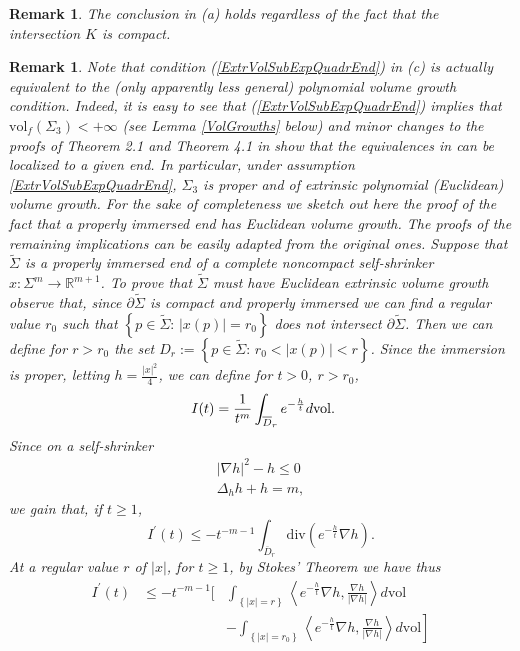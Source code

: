 \documentclass[11pt,leqno]{amsart}\usepackage{amsmath}
\newtheorem{remark}[theorem]{Remark}
\numberwithin{equation}{section}
\begin{document}
\begin{remark}
\rm{The conclusion in (a) holds regardless of the fact that the intersection $K$ is compact.}
\end{remark}
\begin{remark}
\rm{Note that condition (\ref{ExtrVolSubExpQuadrEnd}) in (c) is actually equivalent to the (only apparently less general) polynomial volume growth condition.
Indeed, it is easy to see that (\ref{ExtrVolSubExpQuadrEnd}) implies that $\mathrm{vol}_{f}(\Sigma_3 )< +\infty$ (see Lemma \ref{VolGrowths} below)
and minor changes to the proofs of Theorem 2.1 and Theorem 4.1 in \cite{ChZh-volume} show that the equivalences in \cite{ChZh-volume} can be localized to a given end. In particular, under assumption \eqref{ExtrVolSubExpQuadrEnd}, $\Sigma_3$ is proper and of extrinsic polynomial (Euclidean) volume growth.
For the sake of completeness we sketch out here the proof of the fact that a properly immersed end has Euclidean volume growth. The proofs of the remaining implications can be easily adapted from the original ones. Suppose that $\tilde{\Sigma}$ is a properly immersed end of a complete noncompact self-shrinker $x:\Sigma^m\to\mathbb{R}^{m+1}$. To prove that $\tilde{\Sigma}$ must have Euclidean extrinsic volume growth observe that, since $\partial \tilde{\Sigma}$ is compact and properly immersed we can find a regular value $r_0$ such that $\left\{p\in\tilde{\Sigma}:\,|x(p)|=r_0\right\}$ does not intersect $\partial \tilde{\Sigma}$. Then we can define for $r>r_0$ the set $D_r:=\left\{p\in\tilde{\Sigma}:\,r_0<|x(p)|<r\right\}$. Since the immersion is proper, letting $h=\frac{|x|^2}{4}$, we can define for $t>0$, $r>r_0$,
\[
\ I(t)=\frac{1}{t^m}\int_{\overline{D}_r}e^{-\frac{h}{t}}d\rm{vol}.
\]
Since on a self-shrinker
\begin{eqnarray*}
\left|\nabla h\right|^2-h\leq 0\\
\Delta_{h}h+h=m,
\end{eqnarray*}
we gain that, if $t\geq1$,
\begin{equation*}
I^{\prime}(t)\leq-t^{-m-1}\int_{\overline{D}_r}\mathrm{div}\left(e^{-\frac{h}{t}}\nabla h\right).
\end{equation*}
At a regular value $r$ of $|x|$, for $t\geq 1$, by Stokes' Theorem we have thus
\begin{eqnarray*}
I^{\prime}(t)&\leq-t^{-m-1}\Bigg[&\left.\int_{\left\{|x|=r\right\}}\left\langle e^{-\frac{h}{t}}\nabla h, \frac{\nabla h}{|\nabla h|}\right\rangle d\mathrm{vol}\right.\\
&&\left.-\int_{\left\{|x|=r_{0}\right\}}\left\langle e^{-\frac{h}{t}}\nabla h, \frac{\nabla h}{|\nabla h|}\right\rangle d\mathrm{vol}\right]\\

\end{eqnarray*}}
\end{remark}
\end{document}
